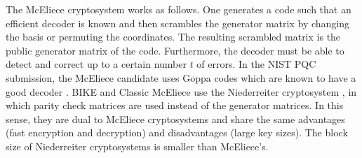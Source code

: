 The McEliece cryptosystem works as follows. One generates a code such that an efficient decoder is known and then scrambles the generator matrix by changing the basis or permuting the coordinates. The resulting scrambled matrix is the public generator matrix of the code. Furthermore, the decoder must be able to detect and correct up to a certain number $t$ of errors. In the NIST PQC submission, the McEliece candidate uses Goppa codes which are known to have a good decoder \cite{mceliece,nistmceliece,mceliecedecoder}. BIKE and Classic McEliece use the Niederreiter cryptosystem \cite{niederreiter}, in which parity check matrices are used instead of the generator matrices. In this sense, they are dual to McEliece cryptosystems and share the same advantages (fast encryption and decryption) and disadvantages (large key sizes). The block size of Niederreiter cryptosystems is smaller than McEliece's.
